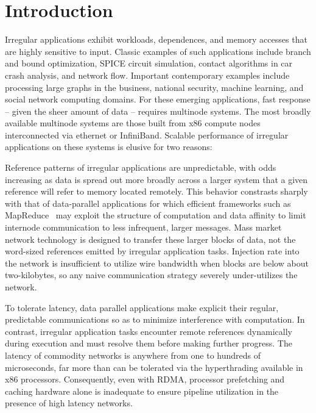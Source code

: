 \section{Introduction} \label{sec:intro}

Irregular applications exhibit workloads, dependences, and memory accesses
that are highly sensitive to input. Classic examples of such applications
include branch and bound optimization, SPICE circuit simulation, contact
algorithms in car crash analysis, and network flow. Important contemporary
examples include processing large graphs in the business, national security,
machine learning, and social network computing domains. For these emerging
applications, fast response -- given the sheer amount of data -- requires
multinode systems. The most broadly available multinode systems are those
built from x86 compute nodes interconnected via ethernet or InfiniBand.
Scalable performance of irregular applications on these systems is elusive
for two reasons:

 Reference patterns of irregular
applications are unpredictable, with odds increasing as data is
spread out more broadly across a larger system that a given reference
will refer to memory located remotely.  This behavior constrasts
sharply with that of data-parallel applications for which efficient
frameworks such as MapReduce~\cite{mapreduce:osdi04} may exploit the
structure of computation and data affinity to limit internode
communication to less infrequent, larger messages.  Mass
market network technology is designed to transfer these larger blocks
of data, not the word-sized references emitted by irregular
application tasks. Injection rate into the network is insufficient to
utilize wire bandwidth when blocks are below about two-kilobytes, so
any naive communication strategy severely under-utilizes the network.

 To tolerate latency, data parallel applications make explicit
their regular, predictable communications so as to minimize interference with computation.
In contrast, irregular application tasks encounter remote references dynamically during
execution and must resolve them before making further progress.  The latency of
commodity networks is anywhere from one to hundreds of microseconds,
far more than can be tolerated via the hyperthrading available in x86 processors.
Consequently, even with RDMA, processor prefetching and caching hardware alone is inadequate
to ensure pipeline utilization in the presence of high latency networks.

